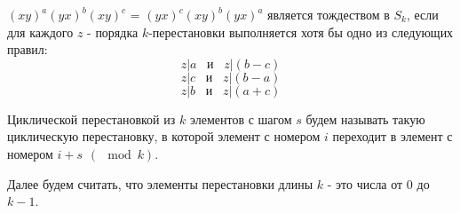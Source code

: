 		$(xy)^a(yx)^b(xy)^c$ = $(yx)^c(xy)^b(yx)^a$ является тождеством в $S_k$, если для каждого $z$ - порядка $k$-перестановки выполняется хотя бы одно из следующих правил:
		\begin{equation} \label{3blocks 1st cond}
		z|a \hspace{10pt} \text{и} \hspace{10pt} z|(b-c)
		\end{equation}
		\begin{equation}
		z|c \hspace{10pt} \text{и} \hspace{10pt} z|(b-a)
		\end{equation}
		\begin{equation} \label{3blocks 3rd cond}
		z|b \hspace{10pt} \text{и} \hspace{10pt} z|(a+c)
		\end{equation}
	
	\begin{definition}
		Циклической перестановкой из $k$ элементов с шагом $s$ будем называть такую циклическую перестановку, в которой элемент с номером $i$ переходит в элемент с номером $i+s \hspace{5pt} (\mod k)$. 
	\end{definition}
	
	Далее будем считать, что элементы перестановки длины $k$ - это числа от $0$ до $k-1$.
	
	\begin{comment}
	\begin{lemma} \label{existence_of_clockwise_and_vv}
		Существуют такие перестановки $x$ и $y$ из $S_k$, что $xy$ - циклическая перестановка с шагом -1, а $yx$ - циклическая перестановка с шагом 1.
	\end{lemma}
	\begin{proof}
		Рассмотрим перестановку $x$: $i \rightarrow -i (\mod k)$ и $y$: $i \rightarrow -i+1 (\mod k)$.
		$$
		x = 
		\begin{pmatrix}
		0&1&2&3&...&k-3&k-2&k-1\\
		0&k-1&k-2&k-3&...&3&2&1
		\end{pmatrix}
		$$
		
		$$
		y = 
		\begin{pmatrix}
		0&1&2&3&...&k-3&k-2&k-1\\
		1&0&k-1&k-2&...&4&3&2
		\end{pmatrix}
		$$
		
		Тогда 
		
		$xy$: $i \xrightarrow y (-i+1) \xrightarrow x (-(-i+1)) == i-1$,
		
		$yx$: $i \xrightarrow x (-i) \xrightarrow y (-(-i)+1) == i+1$
		
	\end{proof}
	\end{comment}
	
